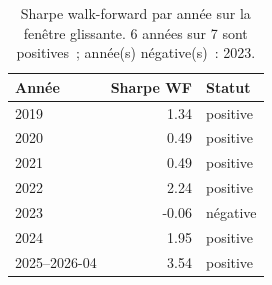 \begin{table}[H]
\centering
\caption{Sharpe walk-forward par année sur la fenêtre glissante. 6 années sur 7 sont positives~; année(s) négative(s)~: 2023.}
\label{tab:walkforward_yearly}
\begin{tabular}{lrl}
\toprule
Année & Sharpe WF & Statut \\
\midrule
2019 & 1.34 & positive \\
2020 & 0.49 & positive \\
2021 & 0.49 & positive \\
2022 & 2.24 & positive \\
2023 & -0.06 & négative \\
2024 & 1.95 & positive \\
2025--2026-04 & 3.54 & positive \\
\bottomrule
\end{tabular}
\end{table}

